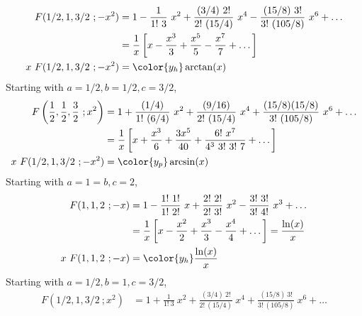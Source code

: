 \begin{enumerate}
\begin{enumerate}
\begin{align}
                        F(1/2,1,3/2\ ;-x^2)    & = 1 - \frac{1}{1!\ 3}\ x^2
                        + \frac{(3/4)\ 2!}{2!\ (15/4)}\ x^4
                        - \frac{(15/8)\ 3!}{3!\ (105/8)}\ x^6 + \dots                  \\
                                               & =\frac{1}{x} \left[ x - \frac{x^3}{3}
                        + \frac{x^5}{5} - \frac{x^7}{7} + \dots \right]                \\
                        x\ F(1/2,1,3/2\ ;-x^2) & = \color{y_h} \arctan(x)
                    \end{align}
                    Starting with $ a = 1/2, b = 1/2, c = 3/2 $,
                    \begin{align}
                        F\left( \frac{1}{2}, \frac{1}{2},
                        \frac{3}{2}\ ; x^2 \right) & = 1 + \frac{(1/4)}
                        {1!\ (6/4)}\ x^2 + \frac{(9/16)}{2!\ (15/4)}\ x^4
                        + \frac{(15/8)(15/8)}{3!\ (105/8)}\ x^6 + \dots       \\
                                                   & =\frac{1}{x} \left[ x
                            + \frac{x^3}{6} + \frac{3x^5}{40}
                        + \frac{6!\ x^7}{4^3\ 3!\ 3!\ 7} + \dots \right]      \\
                        x\ F(1/2,1,3/2\ ;-x^2)     & = \color{y_p} \arcsin(x)
                    \end{align}
                    Starting with $ a = 1 = b, c = 2 $,
                    \begin{align}
                        F(1,1,2\ ; -x)    & = 1 - \frac{1!\ 1!}{1!\ 2!}\ x
                        + \frac{2!\ 2!}{2!\ 3!}\ x^2 - \frac{3!\ 3!}{3!\ 4!}\ x^3
                        + \dots                                                   \\
                                          & = \frac{1}{x}\left[ x - \frac{x^2}{2}
                            + \frac{x^3}{3}
                        - \frac{x^4}{4} + \dots \right] = \frac{\ln(x)}{x}        \\
                        x\ F(1,1,2\ ; -x) & = \color{y_h} \frac{\ln(x)}{x}
                    \end{align}
                    Starting with $ a = 1/2, b = 1, c = 3/2 $,
                    \begin{align}
                        F(1/2,1,3/2\ ;x^2)      & = 1 + \frac{1}{1!\ 3}\ x^2
                        + \frac{(3/4)\ 2!}{2!\ (15/4)}\ x^4
                        + \frac{(15/8)\ 3!}{3!\ (105/8)}\ x^6 + \dots                   \\

\end{align}
\end{enumerate}
\end{enumerate}
